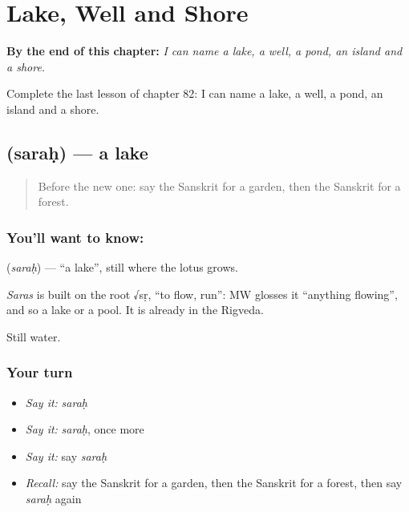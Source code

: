 
\chapter{Lake, Well and Shore}
\label{ch:sa-lake-well-shore}

\begin{chapteropening}
\textbf{By the end of this chapter:} \emph{I can name a lake, a well, a pond, an island and a shore.}

Complete the last lesson of chapter 82: I can name a lake, a well, a pond, an island and a shore.
\end{chapteropening}

\section[\texorpdfstring{\sk{सरः} (saraḥ)}{सरः (saraḥ)}]{ (saraḥ) — a lake}

\label{lesson:SA-C82-lake}



\begin{quote}
Before the new one: say the Sanskrit for a garden, then the Sanskrit for a forest.
\end{quote}

\subsection*{You'll want to know: }
\textbf{} (\emph{saraḥ}) — \textquotedblleft{}a lake\textquotedblright{}, still \textbf{} where the lotus grows.

\begin{cousinweb}
\emph{Saras} is built on the root √sṛ, \textquotedblleft{}to flow, run\textquotedblright{}: MW glosses it \textquotedblleft{}anything flowing\textquotedblright{}, and so a lake or a pool. It is already in the Rigveda.
\end{cousinweb}

\begin{grammarlens}[title={What you've built}]
Still water.
\end{grammarlens}

\subsection*{Your turn}
\begin{itemize}
\raggedright
  \item \emph{Say it:} \emph{saraḥ}
  \item \emph{Say it:} \emph{saraḥ}, once more
  \item \emph{Say it:} say \emph{saraḥ}
  \item \emph{Recall:} say the Sanskrit for a garden, then the Sanskrit for a forest, then say \emph{saraḥ} again
\end{itemize}


